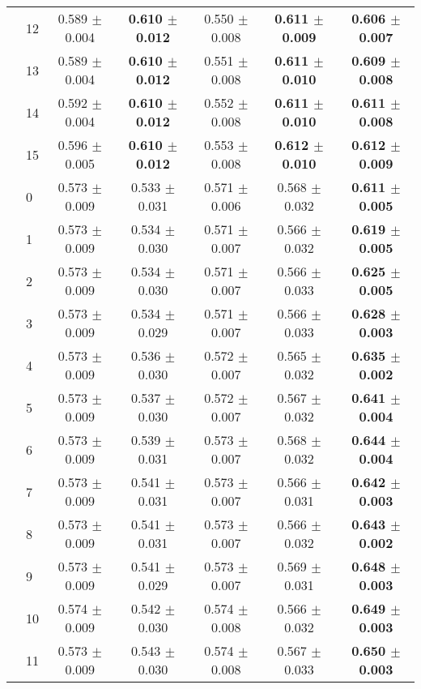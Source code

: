 \begin{table*}[t]
{\begin{tabular}{ll c c c c c}
        & 12 & 0.589 $\pm$ 0.004 & \textbf{0.610 $\pm$ 0.012} & 0.550 $\pm$ 0.008 & \textbf{0.611 $\pm$ 0.009} & \textbf{0.606 $\pm$ 0.007} \\
        & 13 & 0.589 $\pm$ 0.004 & \textbf{0.610 $\pm$ 0.012} & 0.551 $\pm$ 0.008 & \textbf{0.611 $\pm$ 0.010} & \textbf{0.609 $\pm$ 0.008} \\
        & 14 & 0.592 $\pm$ 0.004 & \textbf{0.610 $\pm$ 0.012} & 0.552 $\pm$ 0.008 & \textbf{0.611 $\pm$ 0.010} & \textbf{0.611 $\pm$ 0.008} \\
        & 15 & 0.596 $\pm$ 0.005 & \textbf{0.610 $\pm$ 0.012} & 0.553 $\pm$ 0.008 & \textbf{0.612 $\pm$ 0.010} & \textbf{0.612 $\pm$ 0.009} \\
\midrule
\assist{} & 0 & 0.573 $\pm$ 0.009 & 0.533 $\pm$ 0.031 & 0.571 $\pm$ 0.006 & 0.568 $\pm$ 0.032 & \textbf{0.611 $\pm$ 0.005} \\
        & 1 & 0.573 $\pm$ 0.009 & 0.534 $\pm$ 0.030 & 0.571 $\pm$ 0.007 & 0.566 $\pm$ 0.032 & \textbf{0.619 $\pm$ 0.005} \\
        & 2 & 0.573 $\pm$ 0.009 & 0.534 $\pm$ 0.030 & 0.571 $\pm$ 0.007 & 0.566 $\pm$ 0.033 & \textbf{0.625 $\pm$ 0.005} \\
        & 3 & 0.573 $\pm$ 0.009 & 0.534 $\pm$ 0.029 & 0.571 $\pm$ 0.007 & 0.566 $\pm$ 0.033 & \textbf{0.628 $\pm$ 0.003} \\
        & 4 & 0.573 $\pm$ 0.009 & 0.536 $\pm$ 0.030 & 0.572 $\pm$ 0.007 & 0.565 $\pm$ 0.032 & \textbf{0.635 $\pm$ 0.002} \\
        & 5 & 0.573 $\pm$ 0.009 & 0.537 $\pm$ 0.030 & 0.572 $\pm$ 0.007 & 0.567 $\pm$ 0.032 & \textbf{0.641 $\pm$ 0.004} \\
        & 6 & 0.573 $\pm$ 0.009 & 0.539 $\pm$ 0.031 & 0.573 $\pm$ 0.007 & 0.568 $\pm$ 0.032 & \textbf{0.644 $\pm$ 0.004} \\
        & 7 & 0.573 $\pm$ 0.009 & 0.541 $\pm$ 0.031 & 0.573 $\pm$ 0.007 & 0.566 $\pm$ 0.031 & \textbf{0.642 $\pm$ 0.003} \\
        & 8 & 0.573 $\pm$ 0.009 & 0.541 $\pm$ 0.031 & 0.573 $\pm$ 0.007 & 0.566 $\pm$ 0.032 & \textbf{0.643 $\pm$ 0.002} \\
        & 9 & 0.573 $\pm$ 0.009 & 0.541 $\pm$ 0.029 & 0.573 $\pm$ 0.007 & 0.569 $\pm$ 0.031 & \textbf{0.648 $\pm$ 0.003} \\
        & 10 & 0.574 $\pm$ 0.009 & 0.542 $\pm$ 0.030 & 0.574 $\pm$ 0.008 & 0.566 $\pm$ 0.032 & \textbf{0.649 $\pm$ 0.003} \\
        & 11 & 0.573 $\pm$ 0.009 & 0.543 $\pm$ 0.030 & 0.574 $\pm$ 0.008 & 0.567 $\pm$ 0.033 & \textbf{0.650 $\pm$ 0.003} \\

\end{tabular}}
\end{table*}
